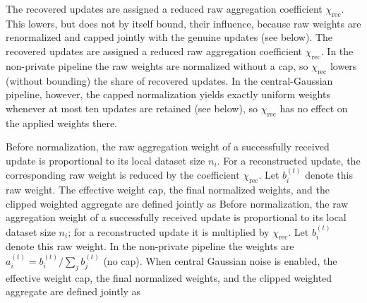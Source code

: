 
The recovered updates are assigned a reduced raw aggregation coefficient \(\chi_{\mathrm{rec}}\). This lowers, but does not by itself bound, their influence, because raw weights are renormalized and capped jointly with the genuine updates (see below).
The recovered updates are assigned a reduced raw aggregation coefficient \(\chi_{\mathrm{rec}}\). In the non-private pipeline the raw weights are normalized without a cap, so \(\chi_{\mathrm{rec}}\) lowers (without bounding) the share of recovered updates. In the central-Gaussian pipeline, however, the capped normalization yields exactly uniform weights whenever at most ten updates are retained (see below), so \(\chi_{\mathrm{rec}}\) has no effect on the applied weights there.

Before normalization, the raw aggregation weight of a successfully received update is proportional to its local dataset size \(n_i\). For a reconstructed update, the corresponding raw weight is reduced by the coefficient \(\chi_{\mathrm{rec}}\). Let \(b_i^{(t)}\) denote this raw weight. The effective weight cap, the final normalized weights, and the clipped weighted aggregate are defined jointly as
\label{sec:aggregation-weights}
Before normalization, the raw aggregation weight of a successfully received update is proportional to its local dataset size \(n_i\); for a reconstructed update it is multiplied by \(\chi_{\mathrm{rec}}\). Let \(b_i^{(t)}\) denote this raw weight. In the non-private pipeline the weights are \(a_i^{(t)}=b_i^{(t)}/\sum_{j}b_j^{(t)}\) (no cap). When central Gaussian noise is enabled, the effective weight cap, the final normalized weights, and the clipped weighted aggregate are defined jointly as

